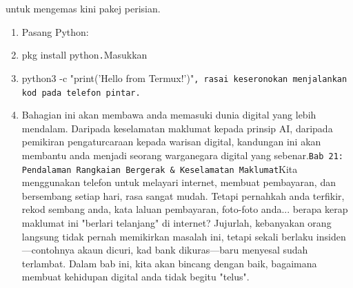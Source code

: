 \begin{tcbpractice}{untuk mengemas kini pakej perisian.}
\begin{enumerate}
  \item Pasang Python:
  \item pkg install python\texttt{.\allowbreak }Masukkan
  \item python3 -c "print('Hello from Termux!')"\texttt{, rasai keseronokan menjalankan kod pada telefon pintar.\allowbreak }
  \item Bahagian ini akan membawa anda memasuki dunia digital yang lebih mendalam. Daripada keselamatan maklumat kepada prinsip AI, daripada pemikiran pengaturcaraan kepada warisan digital, kandungan ini akan membantu anda menjadi seorang warganegara digital yang sebenar.\texttt{Bab 21: Pendalaman Rangkaian Bergerak \& Keselamatan Maklumat}Kita menggunakan telefon untuk melayari internet, membuat pembayaran, dan bersembang setiap hari, rasa sangat mudah. Tetapi pernahkah anda terfikir, rekod sembang anda, kata laluan pembayaran, foto-foto anda... berapa kerap maklumat ini "berlari telanjang" di internet? Jujurlah, kebanyakan orang langsung tidak pernah memikirkan masalah ini, tetapi sekali berlaku insiden—contohnya akaun dicuri, kad bank dikuras—baru menyesal sudah terlambat. Dalam bab ini, kita akan bincang dengan baik, bagaimana membuat kehidupan digital anda tidak begitu "telus".
\end{enumerate}

\end{tcbpractice}
